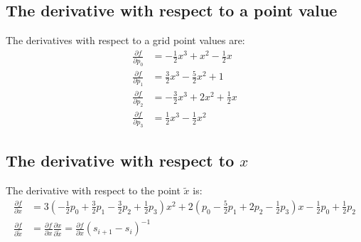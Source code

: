 \documentclass[11pt]{article}
\begin{document}

\subsection{The derivative with respect to a point value}


The derivatives with respect to a grid point values are:
\begin{equation}
\begin{split}
\frac{\partial f}{\partial p_0} &= - \frac{1}{2} x^3 + x^2 - \frac{1}{2} x \\
\frac{\partial f}{\partial p_1} &= \frac{3}{2} x^3 - \frac{5}{2} x^2 + 1 \\
\frac{\partial f}{\partial p_2} &= - \frac{3}{2} x^3 + 2 x^2 + \frac{1}{2} x \\
\frac{\partial f}{\partial p_3} &= \frac{1}{2} x^3 - \frac{1}{2} x^2
\end{split}
\label{eq:derivValue}
\end{equation}


\subsection{The derivative with respect to $x$}


The derivative with respect to the point $\tilde{x}$ is:
\begin{equation}
\begin{split}
\frac{\partial f}{\partial x} &=
3 \left ( - \frac{1}{2} p_0 + \frac{3}{2} p_1 - \frac{3}{2} p_2 + \frac{1}{2} p_3 \right ) x^2 + 2 \left ( p_0 - \frac{5}{2} p_1 + 2 p_2 - \frac{1}{2} p_3 \right ) x  - \frac{1}{2} p_0 + \frac{1}{2} p_2 \\
\frac{\partial f}{\partial \tilde{x}} 
&= \frac{\partial f}{\partial x} \frac{\partial x}{\partial \tilde{x}} = \frac{\partial f}{\partial x} \left ( s_{i+1} - s_i \right )^{-1}
\end{split}
\label{eq:derivAbs}
\end{equation}

\end{document}
